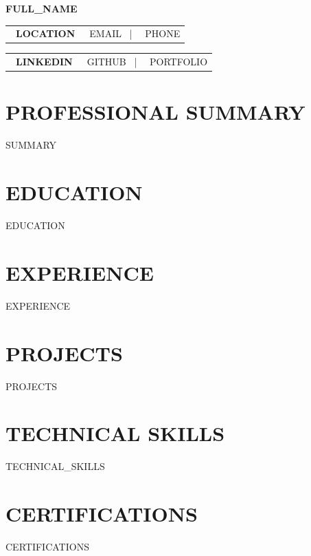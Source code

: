 \documentclass[10pt,a4paper]{article}
\makeatletter
\newcommand{\headerline}[2]{\begin{tabular*}{\textwidth}{@{}l@{\extracolsep{\fill}}r@{}} \textbf{#1} & #2 \end{tabular*}}
\makeatother
\begin{document}
\begin{center}
    {\LARGE \textbf{{{FULL_NAME}}}} \\[4pt]
    \headerline{\faMapMarker\ {{LOCATION}}}{\faEnvelope\ {{EMAIL}} ~|~ \faPhone\ {{PHONE}}}
    \headerline{\faLinkedin\ {{LINKEDIN}}}{\faGithub\ {{GITHUB}} ~|~ \faGlobe\ {{PORTFOLIO}}}
\end{center}

\section*{PROFESSIONAL SUMMARY}
{{SUMMARY}}

\section*{EDUCATION}
{{EDUCATION}}

\section*{EXPERIENCE}
{{EXPERIENCE}}

\section*{PROJECTS}
{{PROJECTS}}

\section*{TECHNICAL SKILLS}
{{TECHNICAL_SKILLS}}

\section*{CERTIFICATIONS}
{{CERTIFICATIONS}}
\end{document}
